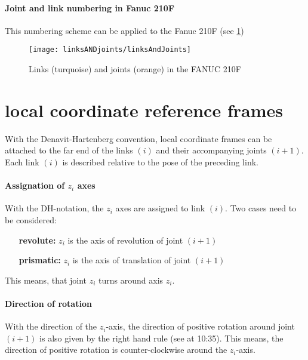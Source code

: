 \paragraph{Joint and link numbering in Fanuc 210F}

This numbering scheme can be applied to the Fanuc 210F (see \ref{fig:LinksANDJoints210F}) 


\begin{figure}[H]
	\texttt{[image: linksANDjoints/linksAndJoints]}
	\caption{Links (turquoise) and joints (orange) in the FANUC 210F}
	\label{fig:LinksANDJoints210F}
\end{figure}



\section{local coordinate reference frames}
With the Denavit-Hartenberg convention, local coordinate frames can be attached to the far end of the links $ (i) $ and their accompanying joints $ (i+1) $.
Each link $(i)$ is described relative to the pose of the preceding link.



\paragraph{Assignation of $z_i$ axes}

With the DH-notation, the $z_i$ axes are assigned to link $(i)$.
Two cases need to be considered: %
\begin{itemize}[wide=\parindent]
	\item[\textbf{revolute:}] $z_i$ is the axis of revolution of joint $(i+1)$
	\item[\textbf{prismatic:}] $z_i$ is the axis of translation of joint $(i+1)$
\end{itemize}
This means, that joint $z_i$ turns around axis $z_i$.

\paragraph{Direction of rotation}
With the direction of the $z_i$-axis, the direction of positive rotation around joint $(i+1)$ is also given by the right hand rule (see \cite{Angela_U1S2P1} at 10:35). This means, the direction of positive rotation is counter-clockwise around the $z_i$-axis.


